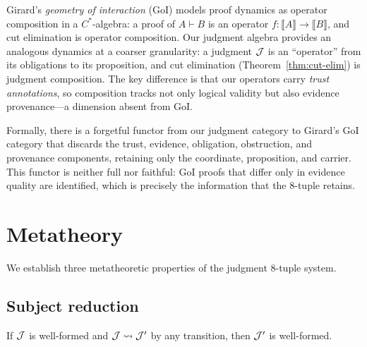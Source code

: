 \documentclass[11pt]{article}
\begin{document}
\begin{remark}
Girard's \emph{geometry of interaction} (GoI)
\cite{Girard1989} models proof dynamics as operator composition in a
$C^*$-algebra: a proof of $A \vdash B$ is an operator
$f \colon \llbracket A \rrbracket \to \llbracket B \rrbracket$, and
cut elimination is operator composition.  Our judgment algebra provides
an analogous dynamics at a coarser granularity: a judgment $\mathcal{J}$ is an
``operator'' from its obligations to its proposition, and cut elimination
(Theorem~\ref{thm:cut-elim}) is judgment composition.  The key difference
is that our operators carry \emph{trust annotations}, so composition
tracks not only logical validity but also evidence provenance---a
dimension absent from GoI.

Formally, there is a forgetful functor from our judgment category to
Girard's GoI category that discards the trust, evidence, obligation,
obstruction, and provenance components, retaining only the coordinate,
proposition, and carrier.  This functor is neither full nor faithful:
GoI proofs that differ only in evidence quality are identified, which
is precisely the information that the 8-tuple retains.
\end{remark}

\section{Metatheory}\label{sec:metatheory}

We establish three metatheoretic properties of the judgment 8-tuple system.

\subsection{Subject reduction}

\begin{theorem}\label{thm:sr}
If $\mathcal{J}$ is well-formed and $\mathcal{J} \leadsto \mathcal{J}'$ by any transition, then $\mathcal{J}'$
is well-formed.
\end{theorem}
\end{document}
